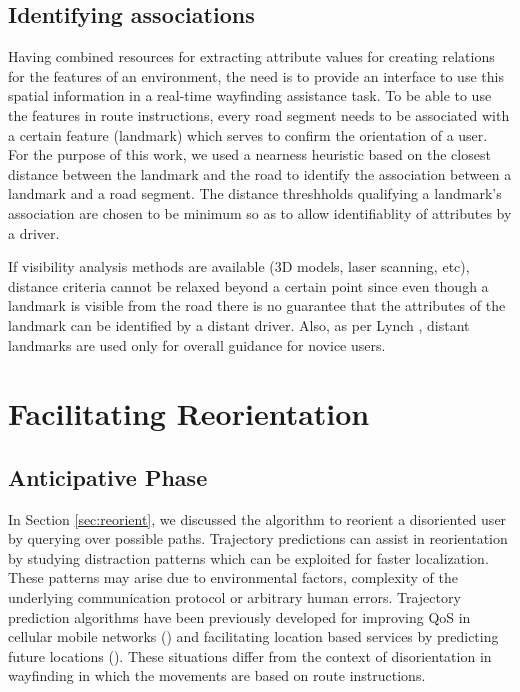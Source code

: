 \documentclass{iitkthesis}
\begin{document}
\subsection{Identifying associations}
Having combined resources for extracting attribute values for creating 
relations for the features of an environment, the need is to provide an 
interface to use this spatial information in a real-time wayfinding 
assistance task. To be able to use the features in route instructions, 
every road segment needs to be associated with a certain feature (landmark) 
which serves to confirm the orientation of a user. For the purpose of 
this work, we used a nearness heuristic based on the closest distance 
between the landmark and the road to identify the association between a 
landmark and a road segment. The distance threshholds qualifying a 
landmark's association are chosen to be minimum so as to allow 
identifiablity of attributes by a driver. 

If visibility analysis methods are available (3D models, laser scanning, 
etc), distance criteria cannot be relaxed beyond a certain point since even
though a landmark is visible from the road there is no guarantee
that the attributes of the landmark can be identified by a 
distant driver. Also, as per Lynch \cite{lynch}, distant landmarks are 
used only for overall guidance for novice users.

\section{Facilitating Reorientation}
\subsection{Anticipative Phase}
\label{sect:anticip}
In Section \ref{sec:reorient}, we discussed the algorithm to reorient a 
disoriented user by querying over possible paths. Trajectory predictions 
can assist in reorientation by studying distraction patterns which can be 
exploited for faster localization. These patterns may arise due to 
environmental factors, complexity of the underlying communication 
protocol or arbitrary human errors. Trajectory prediction algorithms have 
been previously developed for improving QoS in cellular mobile networks 
(\cite{kyri}) and facilitating location based services by predicting 
future locations (\cite{karimi}). These situations differ from the 
context of disorientation in wayfinding in which the movements are 
based on route instructions. 
\end{document}
